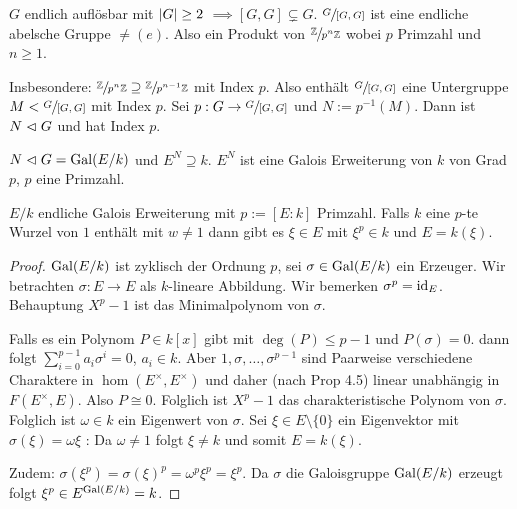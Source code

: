 $G$ endlich auflösbar mit $\abs{G} \geq 2$ $\implies [G,G]  \subsetneq G$.
$\sfrac{G}{[G,G]}$ ist eine endliche abelsche Gruppe $\neq (e)$. Also ein Produkt von $\sfrac{\mathbb{Z}}{p^{n} \mathbb{Z}}$ wobei $p$ Primzahl und $n \geq 1$.

Insbesondere: $\sfrac{\mathbb{Z}}{p^{n}\mathbb{Z}} \supseteq \sfrac{\mathbb{Z}}{p^{n-1} \mathbb{Z}}$ mit Index $p$.
Also enthält $\sfrac{G}{[G,G]}$ eine Untergruppe $M < \sfrac{G}{[G,G]}$ mit Index $p$.
Sei $p : G \to \sfrac{G}{[G,G]}$ und $N := p^{-1}(M)$. Dann ist $N \vartriangleleft G$ und hat Index $p$.

$N \vartriangleleft G = \operatorname{Gal}(E / k)$ und $E^{N} \supseteq k$.
$E^{N}$ ist eine Galois Erweiterung von $k$ von Grad $p$, $p$ eine Primzahl.

\begin{lemma}
	$E / k$ endliche Galois Erweiterung mit  $p := [E : k]$ Primzahl.
	Falls $k$ eine $p$-te Wurzel von $1$ enthält mit $w \neq 1$ dann gibt es $\xi \in E$ mit $\xi^{p} \in k$ und $E = k(\xi)$.
\end{lemma}

\begin{proof}
	$\operatorname{Gal}(E / k)$ ist zyklisch der Ordnung $p$, sei $\sigma \in \operatorname{Gal}(E / k)$ ein Erzeuger.
	Wir betrachten $\sigma: E \to E$ als $k$-lineare Abbildung.
	Wir bemerken $\sigma^{p} = \operatorname{id}_{E}$. Behauptung $X^{p}-1$ ist das Minimalpolynom von $\sigma$.
	
	Falls es ein Polynom $P \in k[x]$ gibt  mit $\deg(P) \leq p-1$ und $P(\sigma) = 0$.
	dann folgt $ \sum_{i=0}^{p-1} a_{i} \sigma^{i} = 0$, $a_{i} \in k$. Aber $1,\sigma,\ldots,\sigma^{p-1}$ sind Paarweise verschiedene Charaktere
	in $\hom(E^{\times}, E^{\times})$ und daher (nach Prop 4.5) linear unabhängig in $F(E^{\times},E)$. Also $P \cong 0$.
	Folglich ist $X^{p}-1$ das charakteristische Polynom von $\sigma$.
	Folglich ist $\omega \in k$ ein Eigenwert von $\sigma$. Sei $\xi \in E \setminus \{0\}$ ein Eigenvektor mit $\sigma(\xi) = \omega \xi$ :
	Da $\omega \neq 1$ folgt $\xi \neq k$ und somit $E = k(\xi)$.

	Zudem: $\sigma(\xi^{p}) = \sigma(\xi)^{p} = \omega^{p} \xi^{p} = \xi^{p}$. Da $\sigma$ die Galoisgruppe $\operatorname{Gal}(E / k)$ erzeugt folgt $\xi^{p} \in E^{\operatorname{Gal}(E / k)} = k$.
\end{proof}


